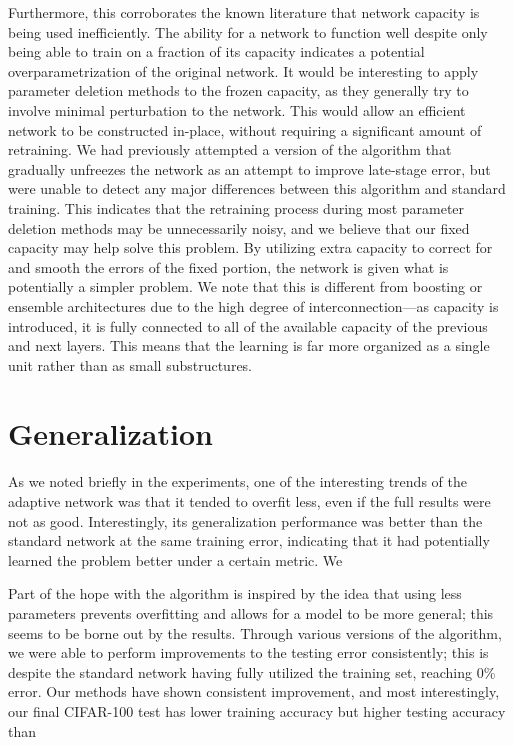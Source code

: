 Furthermore, this corroborates the known literature that network capacity is being used inefficiently.
The ability for a network to function well despite only being able to train on a fraction of its capacity indicates a potential overparametrization of the original network.
It would be interesting to apply parameter deletion methods to the frozen capacity, as they generally try to involve minimal perturbation to the network.
This would allow an efficient network to be constructed in-place, without requiring a significant amount of retraining.
We had previously attempted a version of the algorithm that gradually unfreezes the network as an attempt to improve late-stage error, but were unable to detect any major differences between this algorithm and standard training.
This indicates that the retraining process during most parameter deletion methods may be unnecessarily noisy, and we believe that our fixed capacity may help solve this problem.
By utilizing extra capacity to correct for and smooth the errors of the fixed portion, the network is given what is potentially a simpler problem.
We note that this is different from boosting or ensemble architectures due to the high degree of interconnection---as capacity is introduced, it is fully connected to all of the available capacity of the previous and next layers.
This means that the learning is far more organized as a single unit rather than as small substructures.

\section{Generalization}
As we noted briefly in the experiments, one of the interesting trends of the adaptive network was that it tended to overfit less, even if the full results were not as good.
Interestingly, its generalization performance was better than the standard network at the same training error, indicating that it had potentially learned the problem better under a certain metric.
We 

Part of the hope with the algorithm is inspired by the idea that using less parameters prevents overfitting and allows for a model to be more general; this seems to be borne out by the results.
Through various versions of the algorithm, we were able to perform improvements to the testing error consistently; this is despite the standard network having fully utilized the training set, reaching 0\% error.
Our methods have shown consistent improvement, and most interestingly, our final CIFAR-100 test has lower training accuracy but higher testing accuracy than 

